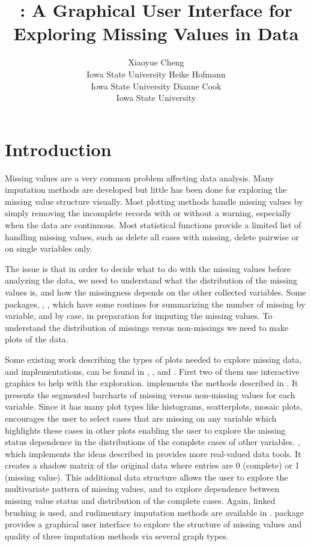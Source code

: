 \documentclass[article]{jss}
\author{Xiaoyue Cheng\\Iowa State University \And 
        Heike Hofmann\\Iowa State University \And
        Dianne Cook\\Iowa State University}
\title{\pkg{MissingDataGUI}: A Graphical User Interface for Exploring 
	Missing Values in Data}
\begin{document}
\section{Introduction}

Missing values are a very common problem affecting data analysis. Many imputation methods are developed but little has been done for exploring the missing value structure visually.  Most plotting methods handle missing values by simply removing the incomplete records with or without a warning, especially when the data are continuous. Most statistical functions provide a limited list of handling missing values, such as delete all cases with missing, delete pairwise or on single variables only.

The issue is that in order to decide what to do with the missing values before analyzing the data, we need to understand what the distribution of the missing values is, and how the missingness depends on the other collected variables. Some  packages,  \citep{norm},  \citep{hmisc}, which have some routines for summarizing the number of missing by variable, and by case, in preparation for imputing the missing values. To understand the distribution of missings versus non-missings we need to make plots of the data.

Some existing work describing the types of plots needed to explore missing data, and implementations, can be found in \citet{unwin1996interactive}, \citet{swayne1998missing}, and \citet{templ2008visualization}. First two of them use interactive graphics to help with the exploration.  implements the methods described in \citet{unwin1996interactive}. It presents the segmented barcharts of missing versus non-missing values for each variable. Since it has many plot types like histograms, scatterplots, mosaic plots,  encourages the user to select cases that are missing on any variable which highlights these cases in other plots enabling the user to explore the missing status dependence in the distributions of the complete cases of other variables.  , which implements the ideas described in \citet{swayne1998missing} provides more real-valued data tools. It creates a shadow matrix of the original data where entries are 0 (complete) or 1 (missing value). This additional data structure allows the user to explore the multivariate pattern of missing values, and to explore dependence between missing value status and distribution of the complete cases. Again, linked brushing is used, and rudimentary imputation methods are available in  \citep{STLBC03}.  package  \citep{VIM} provides a graphical user interface to explore the structure of missing values and quality of three imputation methods via several graph types.
\end{document}
